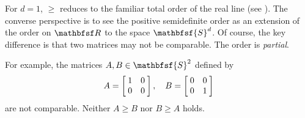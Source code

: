 For $d = 1$, $\geq$ reduces to the familiar total order of the real line (see ).
The converse perspective is to see the positive semidefinite order as an extension of the order on $\R $ to the space $\mathbfsf{S} ^d$.
Of course, the key difference is that two matrices may not be comparable.
The order is \textit{partial}.

For example, the matrices $A, B \in \mathbfsf{S} ^2$ defined by
\[
A = \bmat{
1 & 0 \\
0 & 0
},
\quad
B = \bmat{
0 & 0 \\
0 & 1
}
\]
are not comparable.
Neither $A \geq B$ nor $B \geq A$ holds.

\blankpage